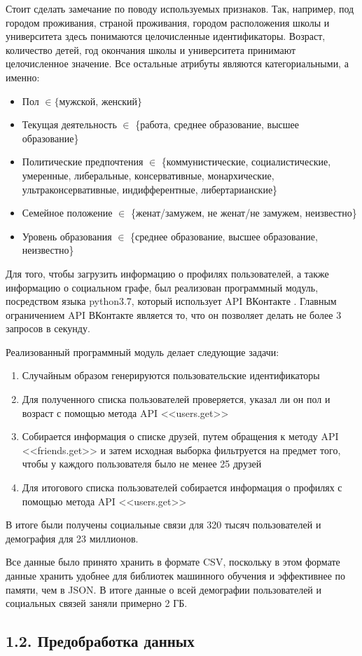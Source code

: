 Стоит сделать замечание по поводу используемых признаков. Так, например, под городом проживания, страной проживания, городом расположения школы и университета здесь понимаются целочисленные идентификаторы. Возраст, количество детей, год окончания школы и университета принимают целочисленное значение. Все остальные атрибуты являются категориальными, а именно:
\begin{itemize}
\item Пол $\in \{\text{мужской, женский}\}$
\item Текущая деятельность $\in$ \{работа, среднее образование, высшее образование\}
\item Политические предпочтения $\in$ \{коммунистические, социалистические, умеренные, либеральные, консервативные, монархические, ультраконсервативные, индифферентные, либертарианские\}
\item Семейное положение $\in$ \{женат/замужем, не женат/не замужем, неизвестно\}
\item Уровень образования $\in$ \{среднее образование, высшее образование, неизвестно\}
\end{itemize}


Для того, чтобы загрузить информацию о профилях пользователей, а также информацию о социальном графе,  был реализован программный модуль, посредством языка python3.7, который использует API ВКонтакте \cite{API VK}. Главным ограничением API ВКонтакте является то, что он позволяет делать не более 3 запросов в секунду.

Реализованный программный модуль делает следующие задачи:
\begin{enumerate}
\item Случайным образом генерируются пользовательские идентификаторы 
\item Для полученного списка пользователей проверяется, указал ли он пол и возраст с помощью метода API <<users.get>>
\item Собирается информация о списке друзей, путем обращения к методу API <<friends.get>> и затем исходная выборка фильтруется на предмет того, чтобы у каждого пользователя было не менее 25 друзей
\item Для итогового списка пользователей собирается информация о профилях с помощью метода API <<users.get>>
\end{enumerate}

В итоге были получены социальные связи для 320 тысяч пользователей и демография для 23 миллионов.

Все данные было принято хранить в формате CSV, поскольку в этом формате данные хранить удобнее для библиотек машинного обучения и эффективнее по памяти, чем в JSON.
В итоге данные о всей демографии пользователей и социальных связей заняли примерно 2 ГБ.

\subsection{1.2. Предобработка данных}



\clearpage